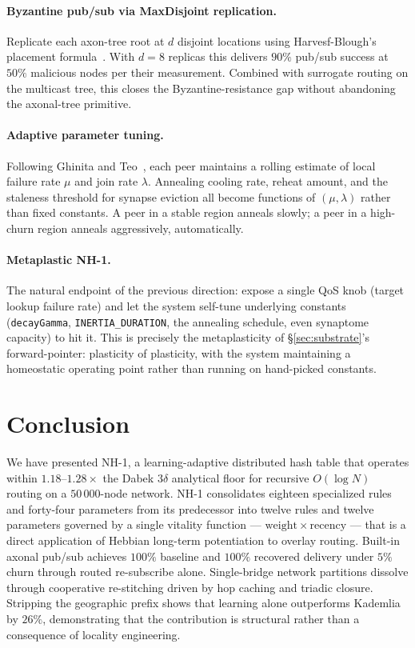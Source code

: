 \documentclass[conference]{IEEEtran}
\newcommand{\nhone}{NH-1\xspace}
\begin{document}
\paragraph{Byzantine pub/sub via MaxDisjoint replication.} Replicate
each axon-tree root at $d$ disjoint locations using
Harvesf-Blough's placement formula~\cite{harvesf2007design}. With
$d = 8$ replicas this delivers $90\%$ pub/sub success at $50\%$
malicious nodes per their measurement. Combined with surrogate routing
on the multicast tree, this closes the Byzantine-resistance gap without
abandoning the axonal-tree primitive.

\paragraph{Adaptive parameter tuning.} Following Ghinita and
Teo~\cite{ghinita2006adaptive}, each peer maintains a rolling estimate
of local failure rate $\mu$ and join rate $\lambda$. Annealing cooling
rate, reheat amount, and the staleness threshold for synapse eviction
all become functions of $(\mu, \lambda)$ rather than fixed constants.
A peer in a stable region anneals slowly; a peer in a high-churn
region anneals aggressively, automatically.

\paragraph{Metaplastic \nhone.} The natural endpoint of the previous
direction: expose a single QoS knob (target lookup failure rate) and
let the system self-tune underlying constants
(\texttt{decayGamma}, \texttt{INERTIA\_DURATION}, the annealing
schedule, even synaptome capacity) to hit it. This is precisely the
metaplasticity of \S\ref{sec:substrate}'s
forward-pointer: plasticity of plasticity, with the system maintaining
a homeostatic operating point rather than running on hand-picked
constants.

\section{Conclusion}
\label{sec:conclusion}

We have presented \nhone, a learning-adaptive distributed hash table
that operates within $1.18$--$1.28\times$ the Dabek $3\delta$
analytical floor for recursive $O(\log N)$ routing on a $50\,000$-node
network. \nhone consolidates eighteen specialized rules and
forty-four parameters from its predecessor into twelve rules and
twelve parameters governed by a single vitality function ---
$\mathrm{weight} \times \mathrm{recency}$ --- that is a direct
application of Hebbian long-term potentiation to overlay routing.
Built-in axonal pub/sub achieves $100\%$ baseline and $100\%$
recovered delivery under $5\%$ churn through routed re-subscribe alone.
Single-bridge network partitions dissolve through cooperative
re-stitching driven by hop caching and triadic closure. Stripping the
geographic prefix shows that learning alone outperforms Kademlia by
$26\%$, demonstrating that the contribution is structural rather than
a consequence of locality engineering.
\end{document}

